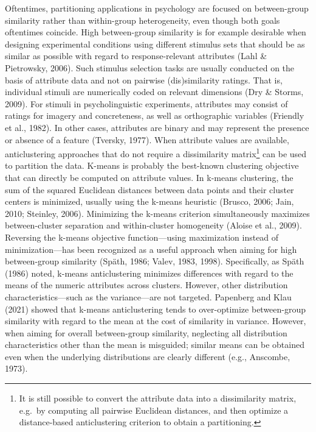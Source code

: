 \documentclass[
  man,floatsintext]{apa7}
\begin{document}
Oftentimes, partitioning applications in psychology are focused on between-group similarity rather than within-group heterogeneity, even though both goals oftentimes coincide. High between-group similarity is for example desirable when designing experimental conditions using different stimulus sets that should be as similar as possible with regard to response-relevant attributes (Lahl \& Pietrowsky, 2006). Such stimulus selection tasks are usually conducted on the basis of attribute data and not on pairwise (dis)similarity ratings. That is, individual stimuli are numerically coded on relevant dimensions (Dry \& Storms, 2009). For stimuli in psycholinguistic experiments, attributes may consist of ratings for imagery and concreteness, as well as orthographic variables (Friendly et al., 1982). In other cases, attributes are binary and may represent the presence or absence of a feature (Tversky, 1977). When attribute values are available, anticlustering approaches that do not require a dissimilarity matrix\footnote{It is still possible to convert the attribute data into a dissimilarity matrix, e.g.~by computing all pairwise Euclidean distances, and then optimize a distance-based anticlustering criterion to obtain a partitioning.} can be used to partition the data. K-means is probably the best-known clustering objective that can directly be computed on attribute values. In k-means clustering, the sum of the squared Euclidean distances between data points and their cluster centers is minimized, usually using the k-means heuristic (Brusco, 2006; Jain, 2010; Steinley, 2006). Minimizing the k-means criterion simultaneously maximizes between-cluster separation and within-cluster homogeneity (Aloise et al., 2009). Reversing the k-means objective function---using maximization instead of minimization---has been recognized as a useful approach when aiming for high between-group similarity (Späth, 1986; Valev, 1983, 1998). Specifically, as Späth (1986) noted, k-means anticlustering minimizes differences with regard to the means of the numeric attributes across clusters. However, other distribution characteristics---such as the variance---are not targeted. Papenberg and Klau (2021) showed that k-means anticlustering tends to over-optimize between-group similarity with regard to the mean at the cost of similarity in variance. However, when aiming for overall between-group similarity, neglecting all distribution characteristics other than the mean is misguided; similar means can be obtained even when the underlying distributions are clearly different (e.g., Anscombe, 1973).
\end{document}
